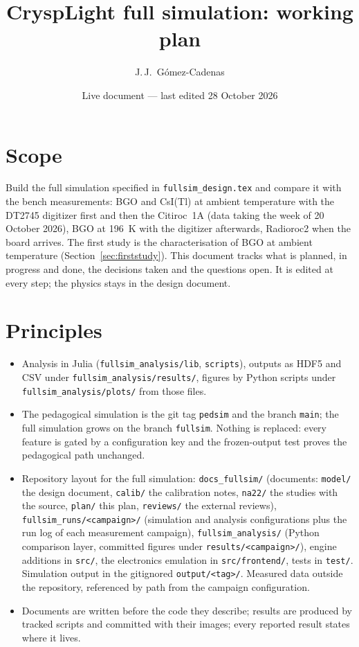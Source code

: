 \documentclass[11pt]{article}
\title{CryspLight full simulation: working plan}
\author{J.\,J.~Gómez-Cadenas}
\date{Live document --- last edited 28 October 2026}
\newcommand{\code}[1]{\texttt{#1}}
\newcommand{\csitl}{CsI(Tl)\xspace}
\begin{document}
\maketitle

\section{Scope}

Build the full simulation specified in \code{fullsim\_design.tex} and compare
it with the bench measurements: BGO and \csitl at ambient temperature with
the DT2745 digitizer first and then the Citiroc~1A (data taking the week of
20 October 2026), BGO at 196~K with the digitizer afterwards, Radioroc2 when
the board arrives. The first study is the characterisation of BGO at ambient
temperature (Section~\ref{sec:firststudy}). This document tracks what is
planned, in progress and done, the decisions taken and the questions open. It
is edited at every step; the physics stays in the design document.

\section{Principles}

\begin{itemize}
\item Analysis in Julia (\code{fullsim\_analysis/lib}, \code{scripts}),
  outputs as HDF5 and CSV under \code{fullsim\_analysis/results/}, figures
  by Python scripts under \code{fullsim\_analysis/plots/} from those files.
\item The pedagogical simulation is the git tag \code{pedsim} and the branch
  \code{main}; the full simulation grows on the branch \code{fullsim}.
  Nothing is replaced: every feature is gated by a configuration key and the
  frozen-output test proves the pedagogical path unchanged.
\item Repository layout for the full simulation: \code{docs\_fullsim/}
  (documents: \code{model/} the design document, \code{calib/} the calibration
  notes, \code{na22/} the studies with the source, \code{plan/} this plan,
  \code{reviews/} the external reviews), \code{fullsim\_runs/<campaign>/} (simulation and analysis
  configurations plus the run log of each measurement campaign),
  \code{fullsim\_analysis/} (Python comparison layer, committed figures under
  \code{results/<campaign>/}), engine additions in \code{src/}, the
  electronics emulation in \code{src/frontend/}, tests in \code{test/}.
  Simulation output in the gitignored \code{output/<tag>/}. Measured data
  outside the repository, referenced by path from the campaign configuration.
\item Documents are written before the code they describe; results are
  produced by tracked scripts and committed with their images; every reported
  result states where it lives.
\end{itemize}
\end{document}
